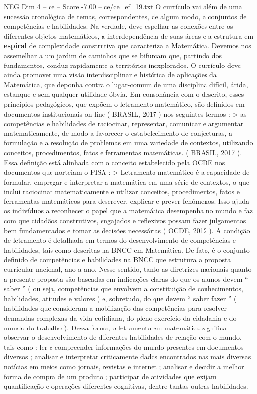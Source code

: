 \begin{textsample}{NEG Dim 4 – ce – Score -7.00 – ce/ce\_ef\_19.txt}
O currículo vai além de uma sucessão cronológica de temas, correspondentes, de algum modo, a conjuntos de competências e habilidades.
Na verdade, deve espelhar as conexões entre os diferentes objetos matemáticos, a interdependência de suas áreas e a estrutura em \textbf{espiral} de complexidade construtiva que caracteriza a Matemática.
Devemos nos assemelhar a um jardim de caminhos que se bifurcam que, partindo dos fundamentos, conduz rapidamente a territórios inexplorados.
O currículo deve ainda promover uma visão interdisciplinar e histórica de aplicações da Matemática, que deponha contra o lugar-comum de uma disciplina difícil, árida, estanque e sem qualquer utilidade óbvia.
Em consonância com o descrito, esses princípios pedagógicos, que expõem o letramento matemático, são definidos em documentos institucionais on-line ( BRASIL, 2017 ) nos seguintes termos : > as competências e habilidades de raciocinar, representar, comunicar e argumentar matematicamente, de modo a favorecer o estabelecimento de conjecturas, a formulação e a resolução de problemas em uma variedade de contextos, utilizando conceitos, procedimentos, fatos e ferramentas matemáticas. ( BRASIL, 2017 ).
Essa definição está alinhada com o conceito estabelecido pela OCDE nos documentos que norteiam o PISA : > Letramento matemático é a capacidade de formular, empregar e interpretar a matemática em uma série de contextos, o que inclui raciocinar matematicamente e utilizar conceitos, procedimentos, fatos e ferramentas matemáticos para descrever, explicar e prever fenômenos.
Isso ajuda os indivíduos a reconhecer o papel que a matemática desempenha no mundo e faz com que cidadãos construtivos, engajados e reflexivos possam fazer julgamentos bem fundamentados e tomar as decisões necessárias ( OCDE, 2012 ).
A condição de letramento é detalhada em termos do desenvolvimento de competências e habilidades, tais como descritas na BNCC em Matemática.
De fato, é o conjunto definido de competências e habilidades na BNCC que estrutura a proposta curricular nacional, ano a ano.
Nesse sentido, tanto as diretrizes nacionais quanto a presente proposta são baseadas em indicações claras do que os alunos devem “ saber ” ( ou seja, competências que envolvem a constituição de conhecimentos, habilidades, atitudes e valores ) e, sobretudo, do que devem “ saber fazer ” ( habilidades que consideram a mobilização das competências para resolver demandas complexas da vida cotidiana, do pleno exercício da cidadania e do mundo do trabalho ).
Dessa forma, o letramento em matemática significa observar o desenvolvimento de diferentes habilidades de relação com o mundo, tais como : ler e compreender informações do mundo presentes em documentos diversos ; analisar e interpretar criticamente dados encontrados nas mais diversas notícias em meios como jornais, revistas e internet ; analisar e decidir a melhor forma de compra de um produto ; participar de atividades que exijam quantificação e operações diferentes cognitivas, dentre tantas outras habilidades.

\end{textsample}
